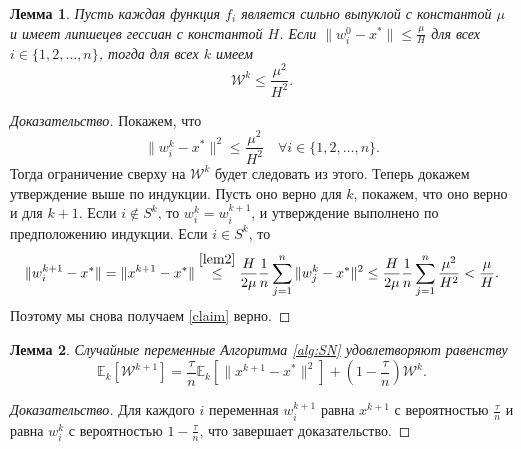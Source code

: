 \documentclass[a4paper, 12pt]{article}
\newcommand{\Exp}{\mathbb{E}}
\newcommand{\cW}{{\mathcal{W}}}
\newtheorem{lem1}{Лемма}
\begin{document}
	\begin{lem1}
	\label{lem3}
	Пусть каждая функция $f_i$ является сильно выпуклой с константой $\mu$ и имеет липшецев гессиан с константой $H$. Если $\|w_i^0-x^*\|\leq \frac{\mu}{H}$ для всех $i\in \{1,2,\dots,n\}$, тогда для всех $k$ имеем
	\begin{equation}
	\cW^k \leq \frac{\mu^2}{H^2}.
	\end{equation}
	\end{lem1}
	\begin{proof}[Доказательство]
	Покажем, что 
	\begin{equation}
	\label{claim}
		\|w_i^k-x^*\|^2 \leq \frac{\mu^2}{H^2}\quad \forall i \in \{1,2,\dots,n\}.
	\end{equation}
	Тогда ограничение сверху на $\cW^k$ будет следовать из этого.   Теперь докажем утверждение выше по индукции. Пусть оно верно для $k$, покажем, что оно верно и для $k+1$. Если $i\notin S^k$, то $w_i^k = w_i^{k+1}$, и утверждение выполнено по предположению индукции. Если $i \in S^k$, то 
	$$\|w_i^{k+1}-x^*\| = \|x^{k+1}-x^*\|\overset{\eqref{lem2}}{\leq} \frac{H}{2\mu}\frac{1}{n}\sum\limits_{j=1}^n\|w_j^k-x^*\|^2\leq \frac{H}{2\mu}\frac{1}{n}\sum\limits_{j=1}^n\frac{\mu^2}{H^2} < \frac{\mu}{H}.$$
	Поэтому мы снова получаем \eqref{claim} верно.
	\end{proof}
	
	\begin{lem1}
	\label{lem4}
		Случайные переменные Алгоритма \eqref{alg:SN} удовлетворяют равенству
		\begin{equation}
			\Exp_k\left[\cW^{k+1}\right] =\frac{\tau}{n}\Exp_k\left[\|x^{k+1}-x^*\|^2\right]+\left(1-\frac{\tau}{n}\right)\cW^k.
		\end{equation}
	\end{lem1}
	\begin{proof}[Доказательство]
		Для каждого $i$ переменная $w_i^{k+1}$ равна $x^{k+1}$ с вероятностью $\frac{\tau}{n}$ и равна $w_i^k$ с вероятностью $1-\frac{\tau}{n}$, что завершает доказательство.
	\end{proof}
	
\end{document}
